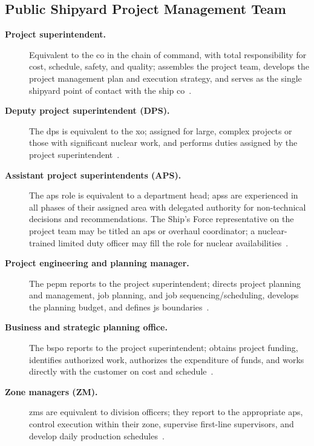 \documentclass[../main.tex]{subfiles}
\begin{document}
\subsection{Public Shipyard Project Management Team}
\begin{description}
  \item[\textbf{Project superintendent.}] Equivalent to the \ac{co} in the chain of command, with total responsibility for cost, schedule, safety, and quality; assembles the project team, develops the project management plan and execution strategy, and serves as the single shipyard point of contact with the ship \ac{co}~\autocite{edo-4-2-2-cno-availability-execution-2025}.
  \item[\textbf{Deputy project superintendent (DPS).}] The \ac{dps} is equivalent to the \ac{xo}; assigned for large, complex projects or those with significant nuclear work, and performs duties assigned by the project superintendent~\autocite{edo-4-2-2-cno-availability-execution-2025}.
  \item[\textbf{Assistant project superintendents (APS).}] The \ac{aps} role is equivalent to a department head; \acp{aps} are experienced in all phases of their assigned area with delegated authority for non-technical decisions and recommendations. The Ship's Force representative on the project team may be titled an \ac{aps} or overhaul coordinator; a nuclear-trained limited duty officer may fill the role for nuclear availabilities~\autocite{edo-4-2-2-cno-availability-execution-2025}.
  \item[\textbf{Project engineering and planning manager.}] The \ac{pepm} reports to the project superintendent; directs project planning and management, job planning, and job sequencing/scheduling, develops the planning budget, and defines \ac{js} boundaries~\autocite{edo-4-2-2-cno-availability-execution-2025}.
  \item[\textbf{Business and strategic planning office.}] The \ac{bspo} reports to the project superintendent; obtains project funding, identifies authorized work, authorizes the expenditure of funds, and works directly with the customer on cost and schedule~\autocite{edo-4-2-2-cno-availability-execution-2025}.
  \item[\textbf{Zone managers (ZM).}] \acp{zm} are equivalent to division officers; they report to the appropriate \ac{aps}, control execution within their zone, supervise first-line supervisors, and develop daily production schedules~\autocite{edo-4-2-2-cno-availability-execution-2025}.
\end{description}
\end{document}
